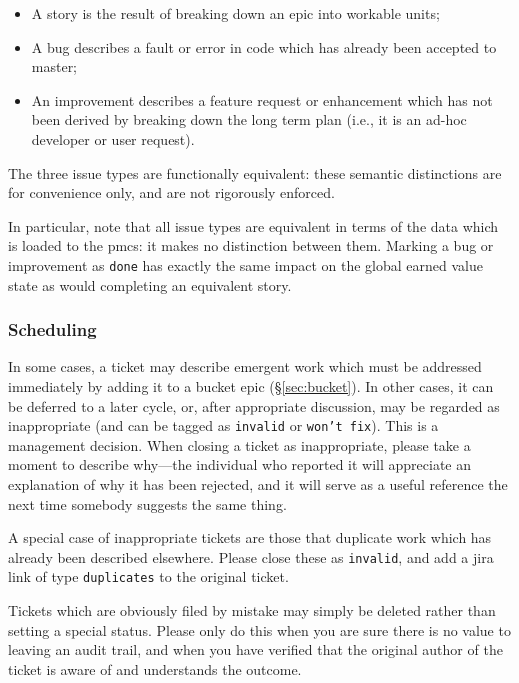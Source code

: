 \begin{itemize}
\item
  A \gls{story} is the result of breaking down an \gls{epic} into workable units;
\item
  A bug describes a fault or error in code which has already been accepted to master;
\item
  An improvement describes a feature request or enhancement which has not been derived by breaking down the long term plan (i.e., it is an ad-hoc developer or user request).
\end{itemize}

The three issue types are functionally equivalent: these semantic distinctions are for convenience only, and are not rigorously enforced.

In particular, note that all issue types are equivalent in terms of the data which is loaded to the \gls{pmcs}: it makes no distinction between them.
Marking a bug or improvement as \texttt{done} has exactly the same impact on the global earned value state as would completing an equivalent \gls{story}.

\subsubsection{Scheduling}\label{scheduling}

In some cases, a ticket may describe emergent work which must be addressed immediately by adding it to a bucket \gls{epic} (\S\ref{sec:bucket}).
In other cases, it can be deferred to a later \gls{cycle}, or, after appropriate discussion, may be regarded as inappropriate (and can be tagged as \texttt{invalid} or \texttt{won't fix}).
This is a management decision.
When closing a ticket as inappropriate, please take a moment to describe why---the individual who reported it will appreciate an explanation of why it has been rejected, and it will serve as a useful reference the next time somebody suggests the same thing.

A special case of inappropriate tickets are those that duplicate work which has already been described elsewhere.
Please close these as \texttt{invalid}, and add a \gls{jira} link of type \texttt{duplicates} to the original ticket.

Tickets which are obviously filed by mistake may simply be deleted
rather than setting a special status. Please only do this when you are
sure there is no value to leaving an audit trail, and when you have
verified that the original author of the ticket is aware of and
understands the outcome.

